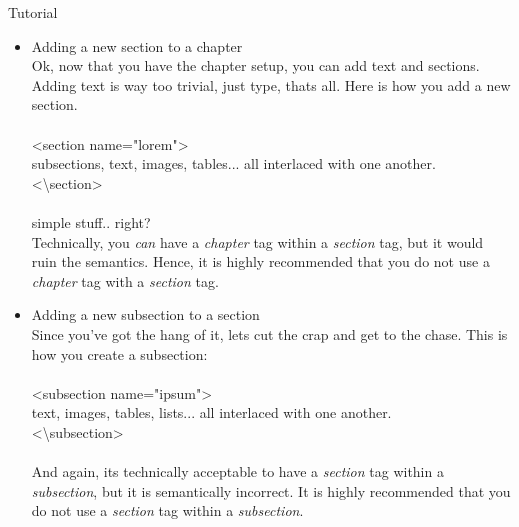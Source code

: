 \documentclass{report}
\begin{document}
\begin{projChapter}{Tutorial}
\begin{itemize}
  \item Adding a new section to a chapter
                ~\\
                Ok, now that you have the chapter setup, you can add text and sections. Adding text is way too trivial, just type, thats all. Here is how you add a new section.
                ~\\\\
                \textless section name="lorem"\textgreater 
                ~\\
                subsections, text, images, tables... all interlaced with one another.
                ~\\
                \textless \textbackslash section\textgreater 
                ~\\\\
                simple stuff.. right?
                ~\\
                Technically, you \textit{can} have a \textit{chapter} tag within a \textit{section} tag, but it would ruin the semantics. Hence, it is highly recommended that you do not use a \textit{chapter} tag with a \textit{section} tag.
            
  \item Adding a new subsection to a section
                ~\\
                Since you've got the hang of it, lets cut the crap and get to the chase. This is how you create a subsection:
                ~\\\\
                \textless subsection name="ipsum"\textgreater 
                ~\\
                text, images, tables, lists... all interlaced with one another.
                ~\\
                \textless \textbackslash subsection\textgreater 
                ~\\\\
                And again, its technically acceptable to have a \textit{section} tag within a \textit{subsection}, but it is semantically incorrect. It is highly recommended that you do not use a \textit{section} tag within a \textit{subsection}.
            
\end{itemize}



\end{projChapter}
\end{document}
